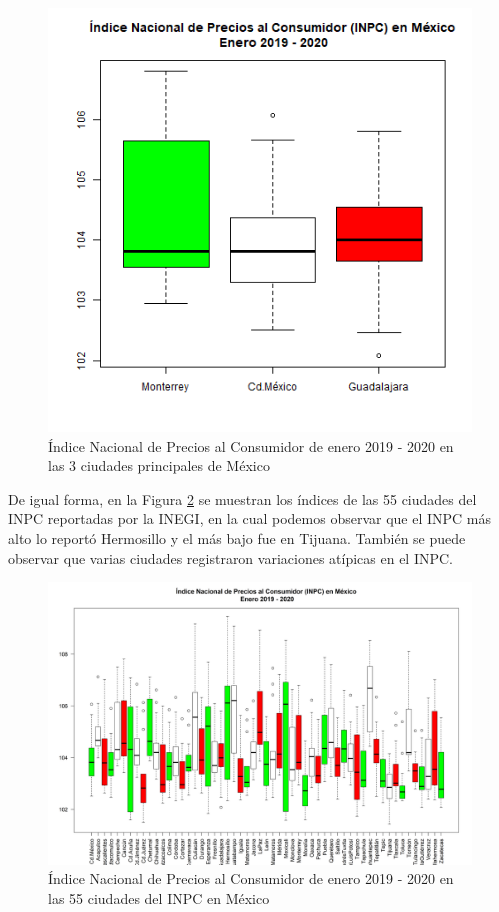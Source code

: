 \documentclass[fontsize=12pt]{article}
\begin{document}
\begin{figure}[htp]
\centering
\includegraphics[scale=0.8]{PrincipalesCiudades}
\caption{Índice Nacional de Precios al Consumidor de enero 2019 - 2020 en las 3 ciudades principales de México}
\label{PrincipalesCiudades}
\end{figure}

De igual forma, en la Figura \ref{TotalCiudades} se muestran los índices de las 55 ciudades del INPC reportadas por la INEGI, en la cual podemos observar que el INPC más alto lo reportó Hermosillo y el más bajo fue en Tijuana. También se puede observar que varias ciudades registraron variaciones atípicas en el INPC.

\begin{figure}[h]
\centering
\includegraphics[scale=0.55]{TotalCiudades}
\caption{Índice Nacional de Precios al Consumidor de enero 2019 - 2020 en las 55 ciudades del INPC en México}
\label{TotalCiudades}
\end{figure}




\end{document}
